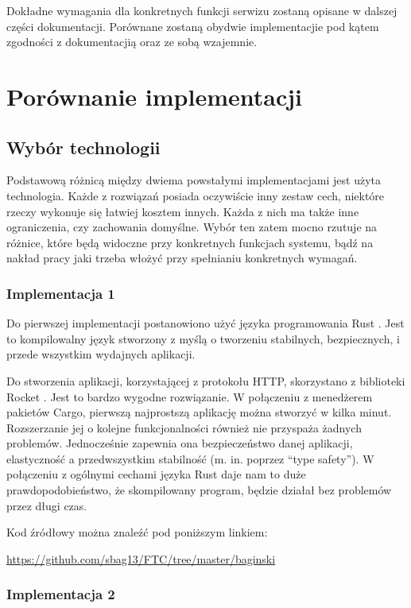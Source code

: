 \documentclass[12pt, notitlepage]{article}
\begin{document}
Dokładne wymagania dla konkretnych funkcji serwizu zostaną opisane w dalszej części dokumentacji. Porównane zostaną obydwie implementacjie pod kątem zgodności z dokumentacjią oraz ze sobą wzajemnie.

\section{Porównanie implementacji}

\subsection{Wybór technologii}

Podstawową różnicą między dwiema powstałymi implementacjami jest użyta technologia. Każde z rozwiązań posiada oczywiście inny zestaw cech, niektóre rzeczy wykonuje się łatwiej kosztem innych. Każda z nich ma także inne ograniczenia, czy zachowania domyślne. Wybór ten zatem mocno rzutuje na różnice, które będą widoczne przy konkretnych funkcjach systemu, bądź na nakład pracy jaki trzeba włożyć przy spełnianiu konkretnych wymagań.

\subsubsection{Implementacja 1}

Do pierwszej implementacji postanowiono użyć języka programowania Rust \cite{rust}. Jest to kompilowalny język stworzony z myślą o tworzeniu stabilnych, bezpiecznych, i przede wszystkim wydajnych aplikacji.

Do stworzenia aplikacji, korzystającej z protokołu HTTP, skorzystano z biblioteki Rocket \cite{rocket}. Jest to bardzo wygodne rozwiązanie. W połączeniu z menedżerem pakietów Cargo, pierwszą najprostszą aplikację można stworzyć w kilka minut. Rozszerzanie jej o kolejne funkcjonalności również nie przyspaża żadnych problemów. Jednocześnie zapewnia ona bezpieczeństwo danej aplikacji, elastyczność a przedwszystkim stabilność (m. in. poprzez ``type safety''). W połączeniu z ogólnymi cechami języka Rust daje nam to duże prawdopodobieństwo, że skompilowany program, będzie działał bez problemów przez długi czas.

Kod źródłowy można znaleźć pod poniższym linkiem:\\
\centerline{\url{https://github.com/sbag13/FTC/tree/master/baginski}}

\subsubsection{Implementacja 2}
\end{document}
